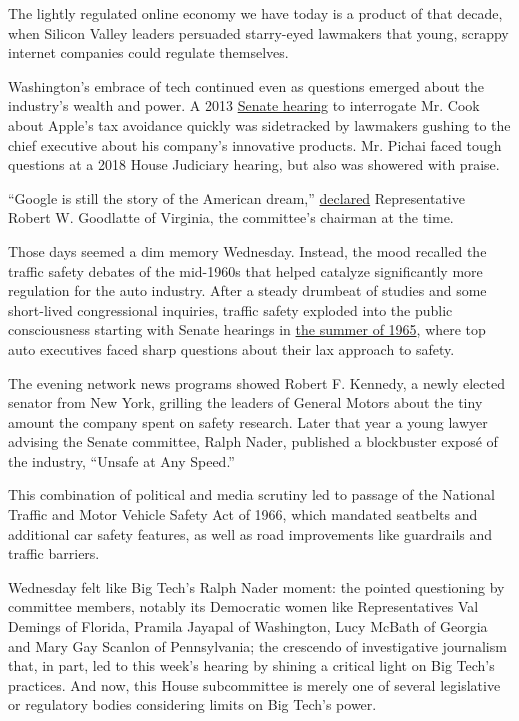 The lightly regulated online economy we have today is a product of that
decade, when Silicon Valley leaders persuaded starry-eyed lawmakers that
young, scrappy internet companies could regulate themselves.

Washington's embrace of tech continued even as questions emerged about
the industry's wealth and power. A 2013
\href{https://www.nytimes3xbfgragh.onion/2013/05/22/technology/ceo-denies-that-apple-is-avoiding-taxes.html}{Senate
hearing} to interrogate Mr. Cook about Apple's tax avoidance quickly was
sidetracked by lawmakers gushing to the chief executive about his
company's innovative products. Mr. Pichai faced tough questions at a
2018 House Judiciary hearing, but also was showered with praise.

``Google is still the story of the American dream,''
\href{https://www.nytimes3xbfgragh.onion/2018/12/11/business/sundar-pichai-google-house-hearing.html}{declared}
Representative Robert W. Goodlatte of Virginia, the committee's chairman
at the time.

Those days seemed a dim memory Wednesday. Instead, the mood recalled the
traffic safety debates of the mid-1960s that helped catalyze
significantly more regulation for the auto industry. After a steady
drumbeat of studies and some short-lived congressional inquiries,
traffic safety exploded into the public consciousness starting with
Senate hearings in
\href{https://www.google.com/books/edition/Federal_Role_in_Traffic_Safety/Kk1KAQAAIAAJ?hl=en\&gbpv=0}{the
summer of 1965}, where top auto executives faced sharp questions about
their lax approach to safety.

The evening network news programs showed Robert F. Kennedy, a newly
elected senator from New York, grilling the leaders of General Motors
about the tiny amount the company spent on safety research. Later that
year a young lawyer advising the Senate committee, Ralph Nader,
published a blockbuster exposé of the industry, ``Unsafe at Any Speed.''

This combination of political and media scrutiny led to passage of the
National Traffic and Motor Vehicle Safety Act of 1966, which mandated
seatbelts and additional car safety features, as well as road
improvements like guardrails and traffic barriers.

Wednesday felt like Big Tech's Ralph Nader moment: the pointed
questioning by committee members, notably its Democratic women like
Representatives Val Demings of Florida, Pramila Jayapal of Washington,
Lucy McBath of Georgia and Mary Gay Scanlon of Pennsylvania; the
crescendo of investigative journalism that, in part, led to this week's
hearing by shining a critical light on Big Tech's practices. And now,
this House subcommittee is merely one of several legislative or
regulatory bodies considering limits on Big Tech's power.

